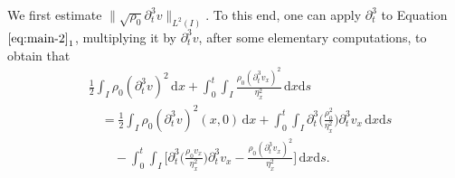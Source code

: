\documentclass[11pt, reqno]{amsart}
\newcommand{\diff}{\mathrm{d}}
\numberwithin{equation}{section}
\begin{document}
We first estimate \(\|\sqrt{\rho_0}\partial_t^3v\|_{L^2(I)}\). To this end,
one can apply \(\partial_t^3\) to Equation \(\eqref{eq:main-2}_1\), multiplying it by \(\partial_t^3v\), after some elementary computations, to obtain that
\begin{equation}\label{II-Priori-time-1}
\begin{aligned}
&\frac{1}{2}\int_I \rho_0(\partial_t^3v)^2\,\diff x
+\int_0^t\int_I\frac{\rho_0(\partial_t^3v_x)^2}{\eta_x^2}\,\diff x\diff s\\
&\quad=\frac{1}{2}\int_I \rho_0(\partial_t^3v)^2(x,0)\,\diff x+\int_0^t\int_I\partial_t^3\bigg({\frac{\rho_0^2}{\eta_x^2}}\bigg)\partial_t^3v_x\,\diff x\diff s\\
&\qquad-\int_0^t\int_I\bigg[\partial_t^3\bigg(\frac{\rho_0v_x}{\eta_x^2}\bigg)\partial_t^3v_x
-\frac{\rho_0(\partial_t^3v_x)^2}{\eta_x^2}\bigg]\,\diff x\diff s.
\end{aligned}
\end{equation}
\end{document}
